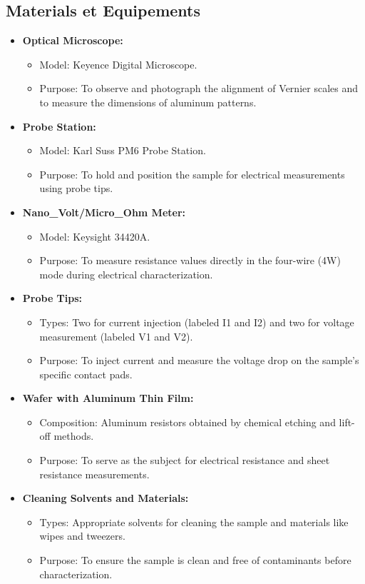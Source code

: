\documentclass[a4paper, table]{article}
\begin{document}
\subsection{Materials et Equipements}
\begin{itemize}
    \item \textbf{Optical Microscope:}
    \begin{itemize}
        \item Model: Keyence Digital Microscope.
        \item Purpose: To observe and photograph the alignment of Vernier scales and to measure the dimensions of aluminum patterns.
    \end{itemize}

    \item \textbf{Probe Station:}
    \begin{itemize}
        \item Model: Karl Suss PM6 Probe Station.
        \item Purpose: To hold and position the sample for electrical measurements using probe tips.
    \end{itemize}

    \item \textbf{Nano\_Volt/Micro\_Ohm Meter:}
    \begin{itemize}
        \item Model: Keysight 34420A.
        \item Purpose: To measure resistance values directly in the four-wire (4W) mode during electrical characterization.
    \end{itemize}

    \item \textbf{Probe Tips:}
    \begin{itemize}
        \item Types: Two for current injection (labeled I1 and I2) and two for voltage measurement (labeled V1 and V2).
        \item Purpose: To inject current and measure the voltage drop on the sample's specific contact pads.
    \end{itemize}

    \item \textbf{Wafer with Aluminum Thin Film:}
    \begin{itemize}
        \item Composition: Aluminum resistors obtained by chemical etching and lift-off methods.
        \item Purpose: To serve as the subject for electrical resistance and sheet resistance measurements.
    \end{itemize}

    \item \textbf{Cleaning Solvents and Materials:}
    \begin{itemize}
        \item Types: Appropriate solvents for cleaning the sample and materials like wipes and tweezers.
        \item Purpose: To ensure the sample is clean and free of contaminants before characterization.
    \end{itemize}
\end{itemize}
\end{document}

